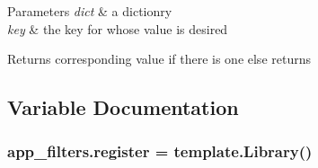 \begin{DoxyParams}{Parameters}
{\em dict} & a dictionry \\
\hline
{\em key} & the key for whose value is desired \\
\hline
\end{DoxyParams}
\begin{DoxyReturn}{Returns}
corresponding value if there is one else returns \textquotesingle{}\textquotesingle{} 
\end{DoxyReturn}


\subsection{Variable Documentation}
\subsubsection[{\texorpdfstring{register}{register}}]{\setlength{\rightskip}{0pt plus 5cm}app\+\_\+filters.\+register = template.\+Library()}\hypertarget{namespaceapp__filters_a028e9a384a0fbaf11a49cff35f9b667b}{}\label{namespaceapp__filters_a028e9a384a0fbaf11a49cff35f9b667b}
